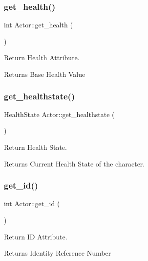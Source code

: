\subsubsection{\texorpdfstring{get\+\_\+health()}{get\_health()}}
{\footnotesize\ttfamily int Actor\+::get\+\_\+health (\begin{DoxyParamCaption}{ }\end{DoxyParamCaption})}



Return Health Attribute. 

\begin{DoxyReturn}{Returns}
Base Health Value 
\end{DoxyReturn}
\mbox{\label{classActor_ab3db004321ad4d3ce4195b1e6173dbfb}} 
\subsubsection{\texorpdfstring{get\+\_\+healthstate()}{get\_healthstate()}}
{\footnotesize\ttfamily Health\+State Actor\+::get\+\_\+healthstate (\begin{DoxyParamCaption}{ }\end{DoxyParamCaption})}



Return Health State. 

\begin{DoxyReturn}{Returns}
Current Health State of the character. 
\end{DoxyReturn}
\mbox{\label{classActor_aa6a652e6ced2aad8f848ea7324365d69}} 
\subsubsection{\texorpdfstring{get\+\_\+id()}{get\_id()}}
{\footnotesize\ttfamily int Actor\+::get\+\_\+id (\begin{DoxyParamCaption}{ }\end{DoxyParamCaption})}



Return ID Attribute. 

\begin{DoxyReturn}{Returns}
Identity Reference Number 
\end{DoxyReturn}
\mbox{\label{classActor_a55a6dcdcec5931619506b2a76ccb9db5}} 
